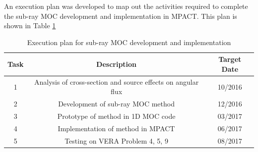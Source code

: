 An execution plan was developed to map out the activities required to complete the sub-ray MOC development and implementation in MPACT.  This plan is shown in Table \ref{t:subrayExecutionPlan}

\begin{table}[h]
  \centering
  \caption{Execution plan for sub-ray MOC development and implementation}\label{t:subrayExecutionPlan}
  \begin{tabular}{|c|c|c|}\toprule
    Task & Description & Target Date \\\midrule
    1 & Analysis of cross-section and source effects on angular flux & 10/2016 \\\midrule
    2 & Development of sub-ray MOC method & 12/2016 \\\midrule
    3 & Prototype of method in 1D MOC code & 03/2017 \\\midrule
    4 & Implementation of method in MPACT & 06/2017 \\\midrule
    5 & Testing on VERA Problem 4, 5, 9 & 08/2017 \\\bottomrule
  \end{tabular}
\end{table}